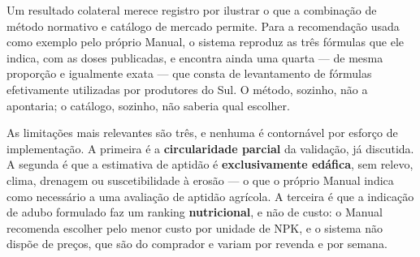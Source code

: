 Um resultado colateral merece registro por ilustrar o que a combinação de método
normativo e catálogo de mercado permite. Para a recomendação usada como exemplo pelo
próprio Manual, o sistema reproduz as três fórmulas que ele indica, com as doses
publicadas, e encontra ainda uma quarta --- de mesma proporção e igualmente exata ---
que consta de levantamento de fórmulas efetivamente utilizadas por produtores do Sul.
O método, sozinho, não a apontaria; o catálogo, sozinho, não saberia qual escolher.

As limitações mais relevantes são três, e nenhuma é contornável por esforço de
implementação. A primeira é a \textbf{circularidade parcial} da validação, já discutida.
A segunda é que a estimativa de aptidão é \textbf{exclusivamente edáfica}, sem relevo,
clima, drenagem ou suscetibilidade à erosão --- o que o próprio Manual indica como
necessário a uma avaliação de aptidão agrícola. A terceira é que a indicação de adubo
formulado faz um ranking \textbf{nutricional}, e não de custo: o Manual recomenda
escolher pelo menor custo por unidade de NPK, e o sistema não dispõe de preços, que são
do comprador e variam por revenda e por semana.

